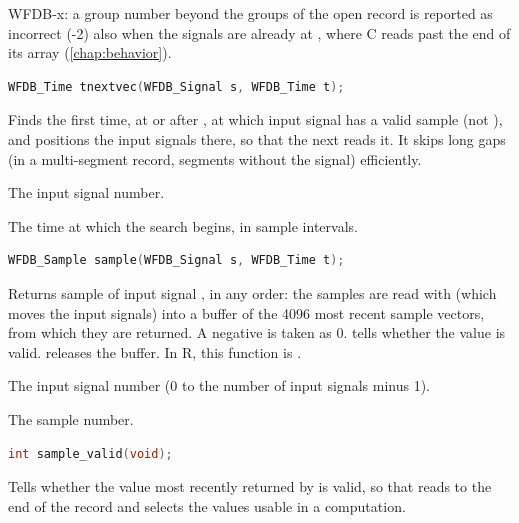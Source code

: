 WFDB-x: a group number beyond the groups of the open record is reported as
incorrect (-2) also when the signals are already at , where C reads
past the end of its array (\cref{chap:behavior}).

\begin{lstlisting}[language=C,style=signature]
WFDB_Time tnextvec(WFDB_Signal s, WFDB_Time t);
\end{lstlisting}
Finds the first time, at or after , at which input signal 
has a valid sample (not ), and positions the
input signals there, so that the next  reads it. It skips long
gaps (in a multi-segment record, segments without the signal) efficiently.
\begin{params}
\item[s] The input signal number.
\item[t] The time at which the search begins, in sample intervals.
\end{params}

\begin{lstlisting}[language=C,style=signature]
WFDB_Sample sample(WFDB_Signal s, WFDB_Time t);
\end{lstlisting}
Returns sample  of input signal , in any order: the samples
are read with  (which moves the input signals) into a buffer of
the 4096 most recent sample vectors, from which they are returned. A negative
 is taken as 0.  tells whether the value is
valid.  releases the buffer. In R, this function is
.
\begin{params}
\item[s] The input signal number (0 to the number of input signals minus 1).
\item[t] The sample number.
\end{params}

\begin{lstlisting}[language=C,style=signature]
int sample_valid(void);
\end{lstlisting}
Tells whether the value most recently returned by  is valid, so
that  reads to the end of the record and
 selects the values usable in a computation.

